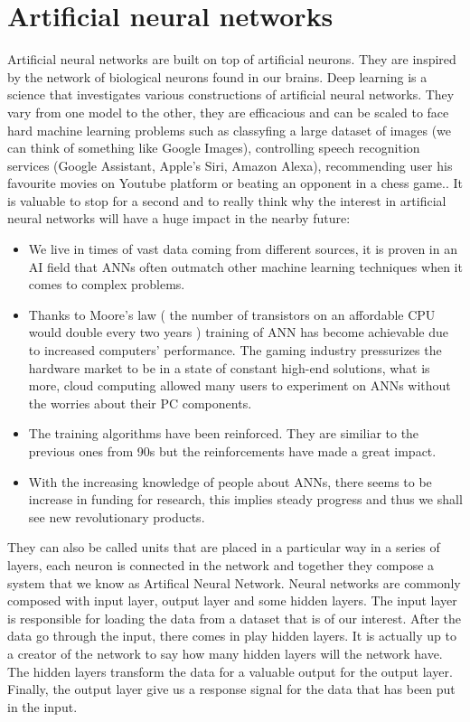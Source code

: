 \documentclass[a4paper,oneside,openright,11pt]{book}
\begin{document}
\section{Artificial neural networks}

Artificial neural networks are built on top of artificial neurons. They are inspired by the network of biological neurons found in our brains. Deep learning is a science that investigates various constructions of
artificial neural networks. They vary from one model to the other, they are efficacious and can be scaled to face hard machine learning problems such as classyfing a large dataset of images (we can think of something like Google Images), controlling speech recognition services (Google Assistant, Apple's Siri, Amazon Alexa), recommending user his favourite movies on Youtube platform or beating an opponent in a chess game.\cite{aurelion}\cite{DeepLearningChess}. It is valuable to stop for a second and to really think why the interest in artificial neural networks will have a huge impact in the nearby future: 
 
\begin{itemize}
    \item We live in times of vast data coming from different sources, it is proven in an AI field that ANNs often outmatch other machine learning techniques when it comes to complex problems.
    \item Thanks to Moore's law ( the number of transistors on an affordable CPU would double every two years \cite{intel}) training of ANN has become achievable due to increased computers' performance. The gaming industry pressurizes the hardware market to be in a state of constant high-end solutions, what is more, cloud computing allowed many users to experiment on ANNs without the worries about their PC components.
    \item The training algorithms have been reinforced. They are similiar to the previous ones from 90s but the reinforcements have made a great impact.
    \item With the increasing knowledge of people about ANNs, there seems to be increase in funding for research, this implies steady progress and thus we shall see new revolutionary products.
\end{itemize}




They can also be called units that are placed in a particular way in a series of layers, each neuron is connected in the network and together they compose a system that we know as Artifical Neural Network. Neural networks are commonly composed with input layer, output layer and some hidden layers. The input layer is responsible for loading the data from a dataset that is of our interest. After the data go through the input, there comes in play hidden layers. It is actually up to a creator of the network to say how many hidden layers will the network have. The hidden layers transform the data for a valuable output for the output layer. Finally, the output layer give us a response signal for the data that has been put in the input. 
\end{document}
